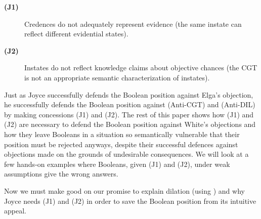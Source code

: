 \documentclass[11pt]{article}
\begin{document}
\begin{description}
\item[{\bf (J1)}] Credences do not adequately represent evidence (the
  same instate can reflect different evidential states).
\item[{\bf (J2)}] Instates do not reflect knowledge claims about
  objective chances (the CGT is not an appropriate semantic
  characterization of instates).
\end{description}

Just as Joyce successfully defends the Boolean position against Elga's
objection, he successfully defends the Boolean position against
(Anti-CGT) and (Anti-DIL) by making concessions (J1) and (J2). The
rest of this paper shows how (J1) and (J2) are necessary to defend the
Boolean position against White's objections and how they leave 
Booleans in a situation so semantically vulnerable that their position
must be rejected anyways, despite their successful defences against
objections made on the grounds of undesirable consequences. We will
look at a few hands-on examples where Booleans, given (J1) and (J2),
under weak assumptions give the wrong answers.

Now we must make good on our promise to explain dilation (using
) and why Joyce needs (J1) and (J2) in order
to save the Boolean position from its intuitive appeal.

\addtocounter{expls}{1}

\end{document}
